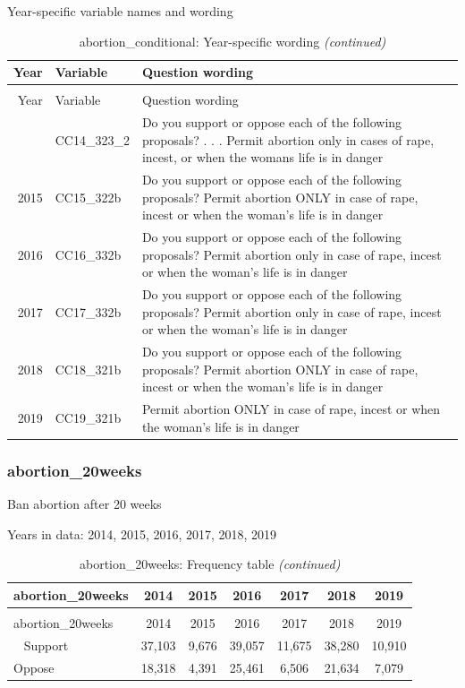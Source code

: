 \documentclass[12pt]{article}
\begin{document}
Year-specific variable names and wording

\begin{longtable}[t]{rl>{\raggedright\arraybackslash}p{10cm}}
\caption{\label{tab:unnamed-chunk-4}abortion\_conditional: Year-specific wording}\\
\toprule
Year & Variable & Question wording\\
\midrule
\endfirsthead
\caption[]{abortion\_conditional: Year-specific wording \textit{(continued)}}\\
\toprule
Year & Variable & Question wording\\
\midrule
\endhead
\
\endfoot
\bottomrule
\endlastfoot
2014 & CC14\_323\_2 & Do you support or oppose each of the following proposals? . . . Permit abortion only in cases of rape, incest, or when the womans life is in danger\\
2015 & CC15\_322b & Do you support or oppose each of the following proposals? Permit abortion ONLY in case of rape, incest or when the woman's life is in danger\\
2016 & CC16\_332b & Do you support or oppose each of the following proposals? Permit abortion only in case of rape, incest or when the woman's life is in danger\\
2017 & CC17\_332b & Do you support or oppose each of the following proposals? Permit abortion only in case of rape, incest or when the woman's life is in danger\\
2018 & CC18\_321b & Do you support or oppose each of the following proposals? Permit abortion ONLY in case of rape, incest or when the woman's life is in danger\\
2019 & CC19\_321b & Permit abortion ONLY in case of rape, incest or when the woman's life is in danger\\*
\end{longtable}

\subsubsection{abortion\_20weeks}\label{abortion_20weeks}

Ban abortion after 20 weeks

Years in data: 2014, 2015, 2016, 2017, 2018, 2019

\begin{longtable}[t]{lcccccc}
\caption{\label{tab:unnamed-chunk-4}abortion\_20weeks: Frequency table}\\
\toprule
abortion\_20weeks & 2014 & 2015 & 2016 & 2017 & 2018 & 2019\\
\midrule
\endfirsthead
\caption[]{abortion\_20weeks: Frequency table \textit{(continued)}}\\
\toprule
abortion\_20weeks & 2014 & 2015 & 2016 & 2017 & 2018 & 2019\\
\midrule
\endhead
\
\endfoot
\bottomrule
\endlastfoot
Support & 37,103 & 9,676 & 39,057 & 11,675 & 38,280 & 10,910\\
Oppose & 18,318 & 4,391 & 25,461 & 6,506 & 21,634 & 7,079\\*
\end{longtable}
\end{document}
